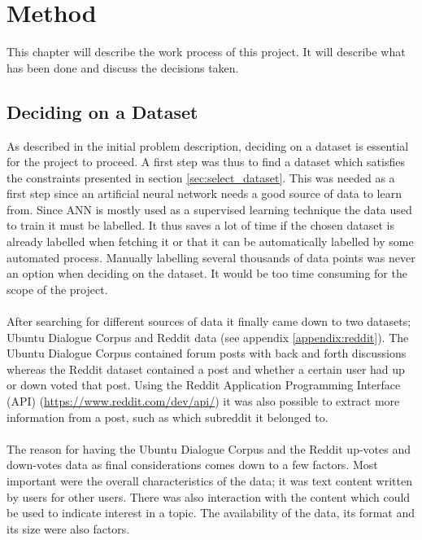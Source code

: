 \chapter{Method}\label{chap:method}
This chapter will describe the work process of this project. It will describe what has been done and discuss the decisions taken.

\section{Deciding on a Dataset}\label{sec:deciding_dataset}
As described in the initial problem description, deciding on a dataset is essential for the project to proceed. A first step was thus to find a dataset which satisfies the constraints presented in section \ref{sec:select_dataset}. This was needed as a first step since an artificial neural network needs a good source of data to learn from. Since ANN is mostly used as a supervised learning technique the data used to train it must be labelled. It thus saves a lot of time if the chosen dataset is already labelled when fetching it or that it can be automatically labelled by some automated process. Manually labelling several thousands of data points was never an option when deciding on the dataset. It would be too time consuming for the scope of the project.
\\\\
After searching for different sources of data it finally came down to two datasets; Ubuntu Dialogue Corpus \parencite{lowe2015ubuntu} and Reddit data (see appendix \ref{appendix:reddit}). The Ubuntu Dialogue Corpus contained forum posts with back and forth discussions whereas the Reddit dataset contained a post and whether a certain user had up or down voted that post. Using the Reddit Application Programming Interface (API) (\url{https://www.reddit.com/dev/api/}) it was also possible to extract more information from a post, such as which subreddit it belonged to.
\\\\
The reason for having the Ubuntu Dialogue Corpus and the Reddit up-votes and down-votes data as final considerations comes down to a few factors. Most important were the overall characteristics of the data; it was text content written by users for other users. There was also interaction with the content which could be used to indicate interest in a topic. The availability of the data, its format and its size were also factors.
\\\\
